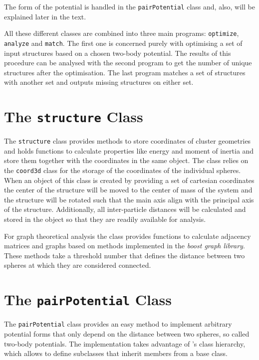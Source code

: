 The form of the potential is handled in the \verb|pairPotential| class and,
also, will be explained later in the text.

All these different classes are combined into three main programs:
\verb|optimize|, \verb|analyze| and \verb|match|. The first one is concerned
purely with optimising a set of input structures based on a chosen two-body
potential. The results of this procedure can be analysed with the second
program to get the number of unique structures after the optimisation. The last
program matches a set of structures with another set and outputs missing
structures on either set.

\section{The \texttt{structure} Class}
\label{sec:thestructureclass}

The \verb|structure| class provides methods to store coordinates of cluster
geometries and holds functions to calculate properties like energy and moment
of inertia and store them together with the coordinates in the same object. The
class relies on the \verb|coord3d| class for the storage of the coordinates of
the individual spheres.  When an object of this class is created by providing a
set of cartesian coordinates the center of the structure will be moved to the
center of mass of the system and the structure will be rotated such that the
main axis align with the principal axis of the structure. Additionally, all
inter-particle distances will be calculated and stored in the object so that
they are readily available for analysis.

For graph theoretical analysis the class provides functions to calculate
adjacency matrices and graphs based on methods implemented in the \textit{boost
graph library}\autocite{_boost_2002}. These methods take a threshold number
that defines the distance between two spheres at which they are considered
connected.

\section{The \texttt{pairPotential} Class}
\label{sec:thepairpotentialclass}

The \texttt{pairPotential} class provides an easy method to implement arbitrary
potential forms that only depend on the distance between two spheres, so called
two-body potentials. The implementation takes advantage of \Cpp's class
hierarchy, which allows to define subclasses that inherit members from a base
class.


